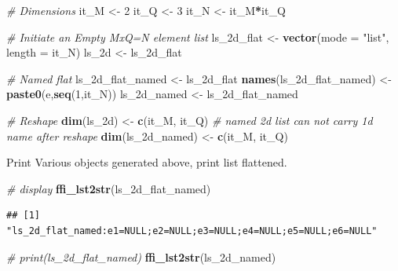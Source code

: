 \documentclass[
]{book}
\newenvironment{Shaded}{\begin{snugshade}}{\end{snugshade}}
\newcommand{\CommentTok}[1]{\textcolor[rgb]{0.56,0.35,0.01}{\textit{#1}}}
\newcommand{\DataTypeTok}[1]{\textcolor[rgb]{0.13,0.29,0.53}{#1}}
\newcommand{\DecValTok}[1]{\textcolor[rgb]{0.00,0.00,0.81}{#1}}
\newcommand{\KeywordTok}[1]{\textcolor[rgb]{0.13,0.29,0.53}{\textbf{#1}}}
\newcommand{\NormalTok}[1]{#1}
\newcommand{\OperatorTok}[1]{\textcolor[rgb]{0.81,0.36,0.00}{\textbf{#1}}}
\newcommand{\StringTok}[1]{\textcolor[rgb]{0.31,0.60,0.02}{#1}}
\begin{document}
\begin{Shaded}
\begin{Highlighting}[]
\CommentTok{\# Dimensions}
\NormalTok{it\_M \textless{}{-}}\StringTok{ }\DecValTok{2}
\NormalTok{it\_Q \textless{}{-}}\StringTok{ }\DecValTok{3}
\NormalTok{it\_N \textless{}{-}}\StringTok{ }\NormalTok{it\_M}\OperatorTok{*}\NormalTok{it\_Q}

\CommentTok{\# Initiate an Empty MxQ=N element list}
\NormalTok{ls\_2d\_flat \textless{}{-}}\StringTok{ }\KeywordTok{vector}\NormalTok{(}\DataTypeTok{mode =} \StringTok{"list"}\NormalTok{, }\DataTypeTok{length =}\NormalTok{ it\_N)}
\NormalTok{ls\_2d \textless{}{-}}\StringTok{ }\NormalTok{ls\_2d\_flat}

\CommentTok{\# Named flat}
\NormalTok{ls\_2d\_flat\_named \textless{}{-}}\StringTok{ }\NormalTok{ls\_2d\_flat}
\KeywordTok{names}\NormalTok{(ls\_2d\_flat\_named) \textless{}{-}}\StringTok{ }\KeywordTok{paste0}\NormalTok{(}\StringTok{\textquotesingle{}e\textquotesingle{}}\NormalTok{,}\KeywordTok{seq}\NormalTok{(}\DecValTok{1}\NormalTok{,it\_N))}
\NormalTok{ls\_2d\_named \textless{}{-}}\StringTok{ }\NormalTok{ls\_2d\_flat\_named}

\CommentTok{\# Reshape}
\KeywordTok{dim}\NormalTok{(ls\_2d) \textless{}{-}}\StringTok{ }\KeywordTok{c}\NormalTok{(it\_M, it\_Q)}
\CommentTok{\# named 2d list can not carry 1d name after reshape}
\KeywordTok{dim}\NormalTok{(ls\_2d\_named) \textless{}{-}}\StringTok{ }\KeywordTok{c}\NormalTok{(it\_M, it\_Q)}
\end{Highlighting}
\end{Shaded}

Print Various objects generated above, print list flattened.

\begin{Shaded}
\begin{Highlighting}[]
\CommentTok{\# display}
\KeywordTok{ffi\_lst2str}\NormalTok{(ls\_2d\_flat\_named)}
\end{Highlighting}
\end{Shaded}

\begin{verbatim}
## [1] "ls_2d_flat_named:e1=NULL;e2=NULL;e3=NULL;e4=NULL;e5=NULL;e6=NULL"
\end{verbatim}

\begin{Shaded}
\begin{Highlighting}[]
\CommentTok{\# print(ls\_2d\_flat\_named)}
\KeywordTok{ffi\_lst2str}\NormalTok{(ls\_2d\_named)}
\end{Highlighting}
\end{Shaded}
\end{document}
